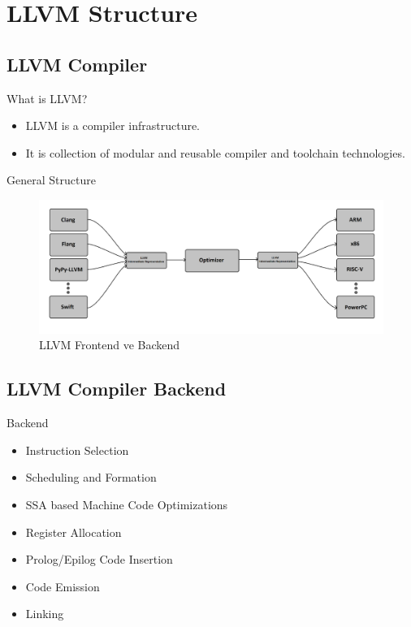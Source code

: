 \section{LLVM Structure} %

\subsection{LLVM Compiler}
\begin{frame}{What is LLVM?}
	\begin {itemize}
	    \item LLVM is a compiler infrastructure.
	    \item It is collection of modular and reusable compiler and toolchain technologies.
	\end {itemize}
\end{frame}
\begin{frame}{General Structure}
    \begin{figure}
	   \includegraphics[width=0.8\linewidth]{llvm_diagram.png}
	   \caption{LLVM Frontend ve Backend}
	\end{figure}
\end{frame}

\subsection{LLVM Compiler Backend}
\begin{frame}{Backend}
    \begin{itemize}
        \item Instruction Selection
        \item Scheduling and Formation
        \item SSA based Machine Code Optimizations
        \item Register Allocation
        \item Prolog/Epilog Code Insertion
        \item Code Emission
        \item Linking
        
    \end{itemize}
\end{frame}

